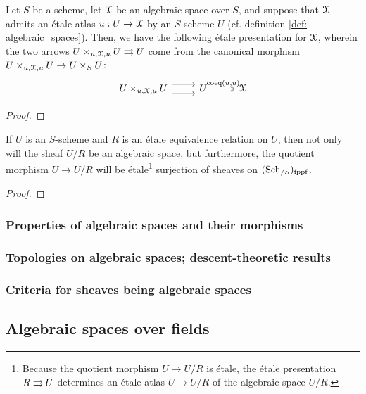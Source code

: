            \begin{proposition} \label{prop: existence_of_etale_presentations_of_algebraic_spaces}
                Let $S$ be a scheme, let $\mathcal{X}$ be an algebraic space over $S$, and suppose that $\mathcal{X}$ admits an \'etale atlas $u: U \to \mathcal{X}$ by an $S$-scheme $U$ (cf. definition \ref{def: algebraic_spaces}). Then, we have the following \'etale presentation for $\mathcal{X}$, wherein the two arrows $U \x_{u, \calX, u} U \toto U$ come from the canonical morphism $U \x_{u, \calX, u} U \to U \x_S U$:
                    $$
                        \begin{tikzcd}
                        	{U \x_{u, \calX, u} U} & U & \calX
                        	\arrow[shift right=2, from=1-1, to=1-2]
                        	\arrow[shift left=2, from=1-1, to=1-2]
                        	\arrow["{\coeq(u, u)}", two heads, from=1-2, to=1-3]
                        \end{tikzcd}
                    $$ 
            \end{proposition}
                \begin{proof}
                    
                \end{proof}
            \begin{proposition} \label{prop: quotients_of_schemes_by_etale_equivalence_relations_are_algebraic_spaces}
                If $U$ is an $S$-scheme and $R$ is an \'etale equivalence relation on $U$, then not only will the sheaf $U/R$ be an algebraic space, but furthermore, the quotient morphism $U \to U/R$ will be \'etale\footnote{Because the quotient morphism $U \to U/R$ is \'etale, the \'etale presentation $R \rightrightarrows U$ determines an \'etale atlas $U \to U/R$ of the algebraic space $U/R$.} surjection of sheaves on $(\mathrm{Sch}_{/S})_{\mathrm{fppf}}$. 
            \end{proposition}
                \begin{proof}
                    
                \end{proof}
                
            \begin{proposition} \label{prop: puhsouts_of_algebraic_spaces}
                
            \end{proposition}
    
        \subsubsection{Properties of algebraic spaces and their morphisms}
        
        \subsubsection{Topologies on algebraic spaces; descent-theoretic results}
        
        \subsubsection{Criteria for sheaves being algebraic spaces}
    
    \subsection{Algebraic spaces over fields}